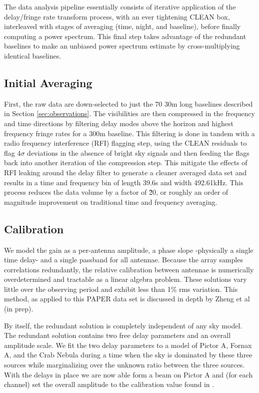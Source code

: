 \documentclass[preprint]{aastex}
\begin{document}
The data analysis pipeline essentially consists of iterative application of the delay/fringe rate transform process, with an ever tightening CLEAN box, interleaved with stages of averaging (time, night, and baseline), before finally computing a power spectrum.  This final step takes advantage of the redundant baselines to make an unbiased power spectrum estimate by cross-multiplying identical baselines.  


\subsection{Initial Averaging}
  First, the raw data are down-selected to just the 70 30m long baselines described in Section \ref{sec:observations}.  %
   The visibilities are then compressed in the frequency and time directions by filtering delay modes above the horizon and highest frequency fringe rates for a 300m baseline.  This filtering is done in tandem with a radio frequency interference (RFI) flagging step, using the CLEAN residuals to flag 4$\sigma$ deviations in the absence of bright sky signals and then feeding the flags back into another iteration of the compression step. This mitigate the effects of RFI leaking around the delay filter to generate a cleaner averaged data set and results in a time and frequency bin of length 39.6s and width 492.61kHz. 
  This process reduces the data volume by a factor of \~20, or roughly an order of magnitude improvement on traditional time and frequency averaging.
  
\subsection{Calibration}
We model the gain as a per-antenna amplitude, a phase slope -physically a single time delay- and a single passband for all antennae.  Because the array samples correlations redundantly, the relative calibration between antennae is numerically overdetermined and tractable as a linear algebra problem.  These solutions vary little over the observing period and exhibit less than 1\% rms variation. This method, as applied to this PAPER data set is discussed in depth by Zheng et al (in prep).

By itself, the redundant solution is completely independent of any sky model. The redundant solution contains two free delay parameters and an overall amplitude scale. We fit the two delay parameters to a model of Pictor A, Fornax A, and the Crab Nebula during a time when the sky is dominated by these three sources while marginalizing over the unknown ratio between the three sources. With the delays in place we are now able form a beam on Pictor A and (for each channel) set the overall amplitude to the calibration value found in \cite{jacobs:2013b}.
  
\end{document}

